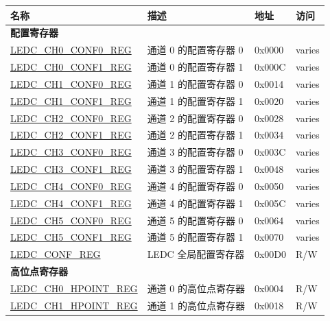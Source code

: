 \begin{longtable}{ | p{5.5cm} | p{7cm} | p{1.3cm} | p{1.7cm} | }
\hline\rowcolor{lightgray}
名称 & 描述 &  地址 & 访问 \\ \hline
\endhead
\multicolumn{4}{|l|}{\textbf{配置寄存器}} \\ \hline
\hyperref[regdesc:LEDCCHNCONF0REG]{LEDC\_CH0\_CONF0\_REG} & 通道 0 的配置寄存器 0 & 0x0000 & varies \\ \hline
\hyperref[regdesc:LEDCCHNCONF1REG]{LEDC\_CH0\_CONF1\_REG} & 通道 0 的配置寄存器 1 & 0x000C & varies \\ \hline
\hyperref[regdesc:LEDCCHNCONF0REG]{LEDC\_CH1\_CONF0\_REG} & 通道 1 的配置寄存器 0 & 0x0014 & varies \\ \hline
\hyperref[regdesc:LEDCCHNCONF1REG]{LEDC\_CH1\_CONF1\_REG} & 通道 1 的配置寄存器 1 & 0x0020 & varies \\ \hline
\hyperref[regdesc:LEDCCHNCONF0REG]{LEDC\_CH2\_CONF0\_REG} & 通道 2 的配置寄存器 0 & 0x0028 & varies \\ \hline
\hyperref[regdesc:LEDCCHNCONF1REG]{LEDC\_CH2\_CONF1\_REG} & 通道 2 的配置寄存器 1 & 0x0034 & varies \\ \hline
\hyperref[regdesc:LEDCCHNCONF0REG]{LEDC\_CH3\_CONF0\_REG} & 通道 3 的配置寄存器 0 & 0x003C & varies \\ \hline
\hyperref[regdesc:LEDCCHNCONF1REG]{LEDC\_CH3\_CONF1\_REG} & 通道 3 的配置寄存器 1 & 0x0048 & varies \\ \hline
\hyperref[regdesc:LEDCCHNCONF0REG]{LEDC\_CH4\_CONF0\_REG} & 通道 4 的配置寄存器 0 & 0x0050 & varies \\ \hline
\hyperref[regdesc:LEDCCHNCONF1REG]{LEDC\_CH4\_CONF1\_REG} & 通道 4 的配置寄存器 1 & 0x005C & varies \\ \hline
\hyperref[regdesc:LEDCCHNCONF0REG]{LEDC\_CH5\_CONF0\_REG} & 通道 5 的配置寄存器 0 & 0x0064 & varies \\ \hline
\hyperref[regdesc:LEDCCHNCONF1REG]{LEDC\_CH5\_CONF1\_REG} & 通道 5 的配置寄存器 1 & 0x0070 & varies \\ \hline
\hyperref[regdesc:LEDCCONFREG]{LEDC\_CONF\_REG} & LEDC 全局配置寄存器 & 0x00D0 & R/W \\ \hline
\multicolumn{4}{|l|}{\textbf{高位点寄存器}} \\ \hline
\hyperref[regdesc:LEDCCHNHPOINTREG]{LEDC\_CH0\_HPOINT\_REG} & 通道 0 的高位点寄存器 & 0x0004 & R/W \\ \hline
\hyperref[regdesc:LEDCCHNHPOINTREG]{LEDC\_CH1\_HPOINT\_REG} & 通道 1 的高位点寄存器 & 0x0018 & R/W \\ \hline

\end{longtable}
